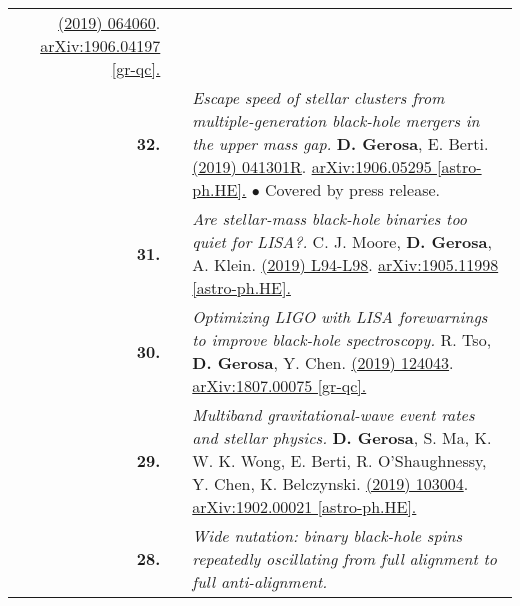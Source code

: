 {\begin{longtable}{rp{0.3cm}p{15.8cm}}
\href{https://journals.aps.org/prd/abstract/10.1103/PhysRevD.100.064060}{\prd 100 (2019) 064060}. \href{https://arxiv.org/abs/1906.04197}{arXiv:1906.04197 [gr-qc].}
\vspace{0.09cm}\\
%
\textbf{32.} & & \textit{Escape speed of stellar clusters from multiple-generation black-hole mergers in the upper mass gap.}
\newline{}
\textbf{D. Gerosa}, E. Berti.
\newline{}
\href{https://journals.aps.org/prd/abstract/10.1103/PhysRevD.100.041301}{\prdrc 100 (2019) 041301R}. \href{https://arxiv.org/abs/1906.05295}{arXiv:1906.05295 [astro-ph.HE].}
\newline{}
\textcolor{color1}{$\bullet$} Covered by press release.
\vspace{0.09cm}\\
%
\textbf{31.} & & \textit{Are stellar-mass black-hole binaries too quiet for LISA?.}
\newline{}
C. J. Moore, \textbf{D. Gerosa}, A. Klein.
\newline{}
\href{https://doi.org/10.1093/mnrasl/slz104}{\mnrasl 488 (2019) L94-L98}. \href{https://arxiv.org/abs/1905.11998}{arXiv:1905.11998 [astro-ph.HE].}
\vspace{0.09cm}\\
%
\textbf{30.} & & \textit{Optimizing LIGO with LISA forewarnings to improve black-hole spectroscopy.}
\newline{}
R. Tso, \textbf{D. Gerosa}, Y. Chen.
\newline{}
\href{https://journals.aps.org/prd/abstract/10.1103/PhysRevD.99.124043}{\prd 99 (2019) 124043}. \href{https://arxiv.org/abs/1807.00075}{arXiv:1807.00075 [gr-qc].}
\vspace{0.09cm}\\
%
\textbf{29.} & & \textit{Multiband gravitational-wave event rates and stellar physics.}
\newline{}
\textbf{D. Gerosa}, S. Ma, K. W. K. Wong, E. Berti, R. O'Shaughnessy, Y. Chen, K. Belczynski.
\newline{}
\href{https://journals.aps.org/prd/abstract/10.1103/PhysRevD.99.103004}{\prd 99 (2019) 103004}. \href{https://arxiv.org/abs/1902.00021}{arXiv:1902.00021 [astro-ph.HE].}
\vspace{0.09cm}\\
%
\textbf{28.} & & \textit{Wide nutation: binary black-hole spins repeatedly oscillating from full alignment to full anti-alignment.}
\newline{}

\end{longtable}}
